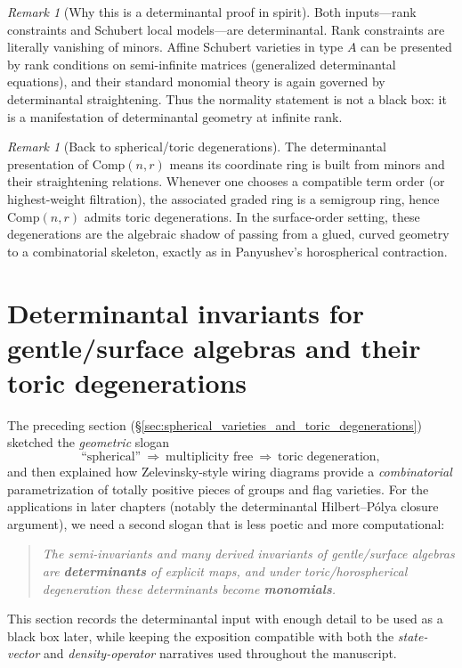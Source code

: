 \documentclass[11pt,oneside]{amsbook}
\numberwithin{equation}{section}
\theoremstyle{plain}
\theoremstyle{definition}
\theoremstyle{remark}
\newtheorem{remark}[theorem]{Remark}
\begin{document}
\begin{remark}[Why this is a determinantal proof in spirit]
Both inputs---rank constraints and Schubert local models---are determinantal.
Rank constraints are literally vanishing of minors.
Affine Schubert varieties in type $A$ can be presented by rank conditions on semi-infinite matrices (generalized determinantal equations), and their standard monomial theory is again governed by determinantal straightening.
Thus the normality statement is not a black box: it is a manifestation of determinantal geometry at infinite rank.
\end{remark}

\begin{remark}[Back to spherical/toric degenerations]
The determinantal presentation of $\mathrm{Comp}(n,r)$ means its coordinate ring is built from minors and their straightening relations.
Whenever one chooses a compatible term order (or highest-weight filtration), the associated graded ring is a semigroup ring, hence $\mathrm{Comp}(n,r)$ admits toric degenerations.
In the surface-order setting, these degenerations are the algebraic shadow of passing from a glued, curved geometry to a combinatorial skeleton, exactly as in Panyushev's horospherical contraction.
\end{remark}



\section{Determinantal invariants for gentle/surface algebras and their toric degenerations}
\label{sec:determinantal_invariants_gentle_toric}

The preceding section (\S\ref{sec:spherical_varieties_and_toric_degenerations}) sketched the \emph{geometric} slogan
\[
\text{``spherical''}\ \Longrightarrow\ \text{multiplicity free}\ \Longrightarrow\ \text{toric degeneration},
\]
and then explained how Zelevinsky-style wiring diagrams provide a \emph{combinatorial} parametrization of totally positive pieces of groups and flag varieties.
For the applications in later chapters (notably the determinantal Hilbert--Pólya closure argument),
we need a second slogan that is less poetic and more computational:
\begin{quote}
\emph{The semi-invariants and many derived invariants of gentle/surface algebras are \textbf{determinants} of explicit maps, and under toric/horospherical degeneration these determinants become \textbf{monomials}.}
\end{quote}
This section records the determinantal input with enough detail to be used as a black box later, while keeping the exposition compatible with both the \emph{state-vector} and \emph{density-operator} narratives used throughout the manuscript.
\end{document}
